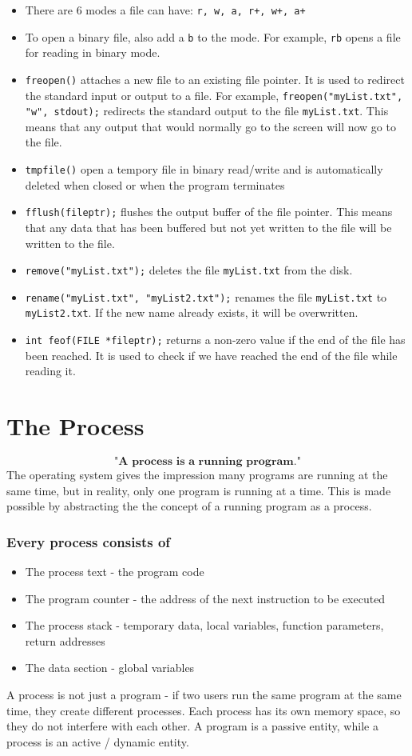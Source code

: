 \documentclass[a4paper, 10pt]{article}
\begin{document}
\begin{itemize}
    \item There are 6 modes a file can have: \texttt{r, w, a, r+, w+, a+}
    \item To open a binary file, also add a \texttt{b} to the mode. For example, \texttt{rb} opens a file for reading in binary mode.
    \item \texttt{freopen()} attaches a new file to an existing file pointer. It is used to redirect the standard input or output to a file. For example, \texttt{freopen("myList.txt", "w", stdout);} redirects the standard output to the file \texttt{myList.txt}. This means that any output that would normally go to the screen will now go to the file.
    \item \texttt{tmpfile()} open a tempory file in binary read/write and is automatically deleted when closed or when the program terminates
    \item \texttt{fflush(fileptr);} flushes the output buffer of the file pointer. This means that any data that has been buffered but not yet written to the file will be written to the file.
    \item \texttt{remove("myList.txt");} deletes the file \texttt{myList.txt} from the disk.
    \item \texttt{rename("myList.txt", "myList2.txt");} renames the file \texttt{myList.txt} to \texttt{myList2.txt}. If the new name already exists, it will be overwritten.
    \item \texttt{int feof(FILE *fileptr);} returns a non-zero value if the end of the file has been reached. It is used to check if we have reached the end of the file while reading it.
\end{itemize}

\section{The Process}
$$\textbf{"A process is a running program."}$$
The operating system gives the impression many programs are running at the same time, but in reality, only one program is running at a time. This is made possible by abstracting the the concept of a running program as a process.
\subsubsection*{Every process consists of}
\begin{itemize}
    \item The process text - the program code
    \item The program counter - the address of the next instruction to be executed
    \item The process stack - temporary data, local variables, function parameters, return addresses
    \item The data section - global variables
\end{itemize}
A process is not just a program - if two users run the same program at the same time, they create different processes. Each process has its own memory space, so they do not interfere with each other. A program is a passive entity, while a process is an active / dynamic entity.
\end{document}
